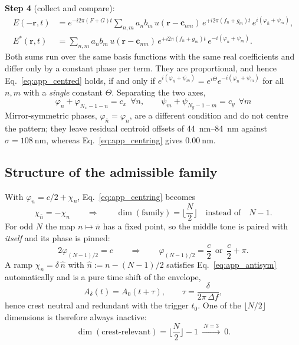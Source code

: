 \noindent\textbf{Step 4} (collect and compare):
\begin{align}
E(-\mathbf{r},t)&=e^{-i2\pi(F+G)t}\sum_{n,m}a_nb_m\,
u(\mathbf{r}-\mathbf{c}_{nm})\,e^{+i2\pi(f_n+g_m)t}\,
e^{i(\varphi_{\bar n}+\psi_{\bar m})},\\
E^{*}(\mathbf{r},t)&=\sum_{n,m}a_nb_m\,
u(\mathbf{r}-\mathbf{c}_{nm})\,e^{+i2\pi(f_n+g_m)t}\,
e^{-i(\varphi_{n}+\psi_{m})} .
\end{align}
Both sums run over the same basis functions with the same real coefficients and
differ only by a constant phase per term. They are proportional, and hence
Eq.~\eqref{eq:app_centred} holds, if and only if
$e^{i(\varphi_{\bar n}+\psi_{\bar m})}
=e^{i\Theta}e^{-i(\varphi_n+\psi_m)}$ for all $n,m$ with a \emph{single}
constant $\Theta$. Separating the two axes,
\begin{equation}
\boxed{\;
\varphi_n+\varphi_{N_x-1-n}=c_x\ \ \forall n,
\qquad
\psi_m+\psi_{N_y-1-m}=c_y\ \ \forall m \;}
\label{eq:app_centring}
\end{equation}
Mirror-symmetric phases, $\varphi_{\bar n}=\varphi_n$, are a different
condition and do not centre the pattern; they leave residual centroid offsets
of \SIrange{44}{84}{\nano \metre} against $\sigma=\SI{108}{\nano \metre}$,
whereas Eq.~\eqref{eq:app_centring} gives $\SI{0.00}{\nano \metre}$.

\subsection{Structure of the admissible family}

With $\varphi_n=c/2+\chi_n$, Eq.~\eqref{eq:app_centring} becomes
\begin{equation}
\chi_{\bar n}=-\chi_n
\qquad\Longrightarrow\qquad
\dim(\text{family})=\Big\lfloor\frac{N}{2}\Big\rfloor
\quad\text{instead of}\quad N-1 .
\label{eq:app_antisym}
\end{equation}
For odd $N$ the map $n\mapsto\bar n$ has a fixed point, so the middle tone is
paired with \emph{itself} and its phase is pinned:
\begin{equation}
2\varphi_{(N-1)/2}=c
\qquad\Longrightarrow\qquad
\varphi_{(N-1)/2}=\frac{c}{2}\ \ \text{or}\ \ \frac{c}{2}+\pi .
\label{eq:app_mid}
\end{equation}
A ramp $\chi_n=\delta\,\hat n$ with $\hat n:=n-(N-1)/2$ satisfies
Eq.~\eqref{eq:app_antisym} automatically and is a pure time shift of the
envelope,
\begin{equation}
A_\delta(t)=A_0(t+\tau),
\qquad
\tau=\frac{\delta}{2\pi\,\Delta f} ,
\label{eq:app_ramp}
\end{equation}
hence crest neutral and redundant with the trigger $t_0$. One of the
$\lfloor N/2\rfloor$ dimensions is therefore always inactive:
\begin{equation}
\dim(\text{crest-relevant})=\Big\lfloor\frac{N}{2}\Big\rfloor-1
\ \xrightarrow{\ N=3\ }\ 0 .
\label{eq:app_dim}
\end{equation}

